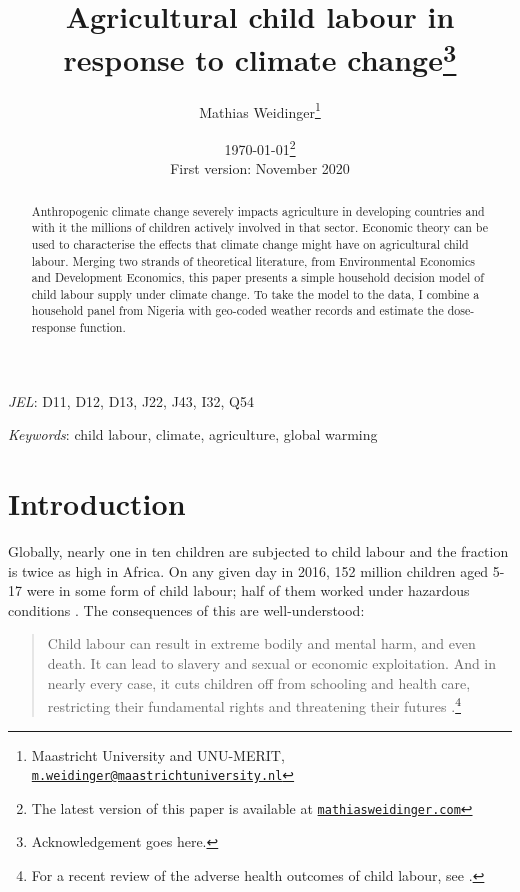\documentclass[a4paper,12pt]{article}
\title{Agricultural child labour in response to climate change\footnote{Acknowledgement goes here.}}
\author{Mathias Weidinger\footnote{Maastricht University and UNU-MERIT, \href{mailto:m.weidinger@maastrichtuniversit.nl}{\texttt{m.weidinger@maastrichtuniversity.nl}}}}
\date{\today \footnote{The latest version of this paper is available at \href{https://www.mathiasweidinger.com}{\texttt{mathiasweidinger.com}}} \\ First version: November 2020}
\theoremstyle{plain}
\theoremstyle{definition}
\theoremstyle{definition}
\theoremstyle{definition}
\theoremstyle{definition}
\begin{document}
\maketitle

\begin{abstract}
Anthropogenic climate change severely impacts agriculture in developing countries and with it the millions of children actively involved in that sector. Economic theory can be used to characterise the effects that climate change might have on agricultural child labour. Merging two strands of theoretical literature, from Environmental Economics and Development Economics, this paper presents a simple household decision model of child labour supply under climate change. To take the model to the data, I combine a household panel from Nigeria with geo-coded weather records and estimate the dose-response function.

\end{abstract}

\textit{JEL}: D11, D12, D13, J22, J43, I32, Q54

\textit{Keywords}: child labour, climate, agriculture, global warming

\clearpage




\section{Introduction}
\label{intro}

Globally, nearly one in ten children are subjected to child labour and the fraction is twice as high in Africa. On any given day in 2016, 152 million children aged 5-17 were in some form of child labour; half of them worked under hazardous conditions \citep{ILO2017}. The consequences of this are well-understood:

\begin{quote}
    Child labour can result in extreme bodily and mental harm, and even death. It can lead to slavery and sexual or economic exploitation. And in nearly every case, it cuts children off from schooling and health care, restricting their fundamental rights and threatening their futures \citep{UNICEF2020}.\footnote{For a recent review of the adverse health outcomes of child labour, see \citet{Ibrahim2018}.}
\end{quote}
\end{document}
